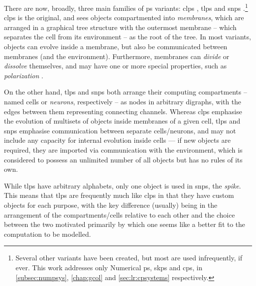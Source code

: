 There are now, broadly, three main families of \gls{ps} variants:  \gls{clps} \cite{Paun2001,Paun2002}, \gls{tlps} \cite{tMaPaPaRo01a,Martin-Vide2003} and \gls{snps} \cite{Ionescu2006}.\footnote{Several other variants have been created, but most are used infrequently, if ever.  This work addresses only Numerical \gls{ps}, \gls{skps} and \gls{cps}, in \cref{subsec:numpsys}, \cref{chap:gcol} and \cref{sec:lr:cpsystems} respectively.}  \Gls{clps} is the original, and sees objects compartmented into \emph{membranes}, which are arranged in a graphical tree structure with the outermost membrane -- which separates the cell from its environment -- as the root of the tree.  In most variants, objects can evolve inside a membrane, but also be communicated between membranes (and the environment).  Furthermore, membranes can \emph{divide} or \emph{dissolve} themselves, and may have one or more special properties, such as \emph{polarization} \cite{Paun1999a}.

On the other hand, \gls{tlps} and \gls{snps} both arrange their computing compartments -- named cells or \emph{neurons}, respectively -- as nodes in arbitrary digraphs, with the edges between them representing connecting channels.  Whereas \gls{clps} emphasise the evolution of multisets of objects inside membranes of a given cell, \gls{tlps} and \gls{snps} emphasise communication between separate cells/neurons, and may not include any capacity for internal evolution inside cells --- if new objects are required, they are imported via communication with the environment, which is considered to possess an unlimited number of all objects but has no rules of its own.


While \gls{tlps} have arbitrary alphabets, only one object is used in \gls{snps}, the \emph{spike}.  This means that \gls{tlps} are frequently much like \gls{clps} in that they have custom objects for each purpose, with the key difference (usually) being in the arrangement of the compartments/cells relative to each other and the choice between the two motivated primarily by which one seems like a better fit to the computation to be modelled.


